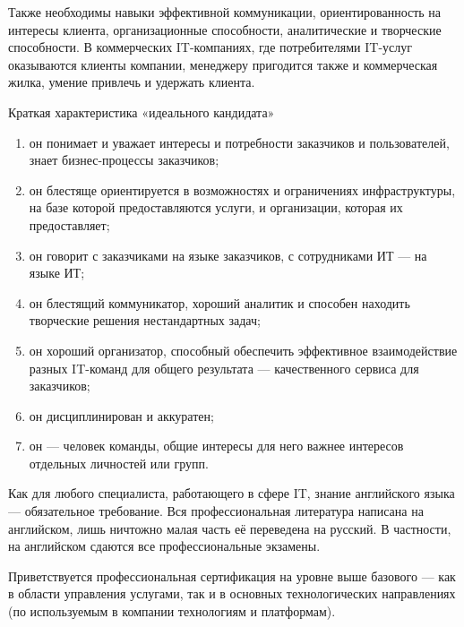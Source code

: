\documentclass{../industrial-development}
\begin{document}
Также необходимы навыки эффективной коммуникации, ориентированность на интересы клиента, организационные способности, аналитические и творческие способности. В коммерческих IT-компаниях, где потребителями IT-услуг оказываются клиенты компании, менеджеру пригодится также и коммерческая жилка, умение привлечь и удержать клиента.

Краткая характеристика «идеального кандидата»
\begin{enumerate}
\item он понимает и уважает интересы и потребности заказчиков и пользователей, знает бизнес-процессы заказчиков;
\item он блестяще ориентируется в возможностях и ограничениях инфраструктуры, на базе которой предоставляются услуги, и организации, которая их предоставляет;
\item он говорит с заказчиками на языке заказчиков, с сотрудниками ИТ — на языке ИТ;
\item он блестящий коммуникатор, хороший аналитик и способен находить творческие решения нестандартных задач;
\item он хороший организатор, способный обеспечить эффективное взаимодействие разных IT-команд для общего результата — качественного сервиса для заказчиков;
\item он дисциплинирован и аккуратен;
\item он — человек команды, общие интересы для него важнее интересов отдельных личностей или групп.
\end{enumerate}

Как для любого специалиста, работающего в сфере IT, знание английского языка — обязательное требование. Вся профессиональная литература написана на английском, лишь ничтожно малая часть её переведена на русский. В частности, на английском сдаются все профессиональные экзамены.

Приветствуется профессиональная сертификация на уровне выше базового — как в области управления услугами, так и в основных технологических направлениях (по используемым в компании технологиям и платформам).
\end{document}
